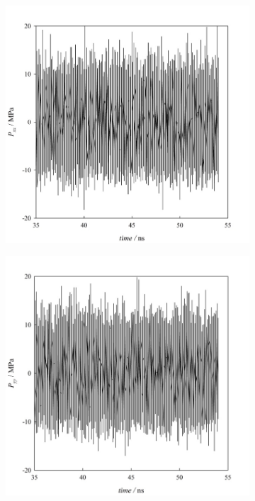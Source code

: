 \documentclass[9pt,bestpractices]{livecoms}
\begin{document}
\begin{figure}
	\centering
	\begin{subfigure}{0.2\textwidth} %
    \includegraphics[width=1\textwidth]{gfx/image56.jpeg}
	\end{subfigure}
	\begin{subfigure}{0.2\textwidth} %
    \includegraphics[width=1\textwidth]{gfx/image57.jpeg}

\end{subfigure}
\end{figure}
\end{document}
